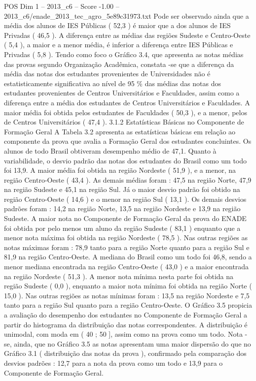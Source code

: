 \begin{textsample}{POS Dim 1 – 2013\_c6 – Score -1.00 – 2013\_c6/enade\_2013\_tec\_agro\_5e89c31973.txt}
Pode ser observado ainda que a média dos alunos de IES Públicas ( 52,3 ) é maior que a dos alunos de IES Privadas ( 46,5 ).
A diferença entre as médias das regiões Sudeste e Centro-Oeste ( 5,4 ), a maior e a menor média, é inferior a diferença entre IES Públicas e Privadas ( 5,8 ).
Tendo como foco o Gráfico 3.4, que apresenta as notas médias das provas segundo Organização Acadêmica, constata -se que a diferença da média das notas dos estudantes provenientes de Universidades não é estatisticamente significativa ao nível de 95 \% das médias das notas dos estudantes provenientes de Centros Universitários e Faculdades, assim como a diferença entre a média dos estudantes de Centros Universitários e Faculdades.
A maior média foi obtida pelos estudantes de Faculdades ( 50,3 ), e a menor, pelos de Centros Universitários ( 47,4 ). 3.1.2 Estatísticas Básicas no Componente de Formação Geral A Tabela 3.2 apresenta as estatísticas básicas em relação ao componente da prova que avalia a Formação Geral dos estudantes concluintes.
Os alunos de todo Brasil obtiveram desempenho médio de 47,1.
Quanto à variabilidade, o desvio padrão das notas dos estudantes do Brasil como um todo foi 13,9.
A maior média foi obtida na região Nordeste ( 51,9 ), e a menor, na região Centro-Oeste ( 43,4 ).
As demais médias foram : 47,5 na região Norte, 47,9 na região Sudeste e 45,1 na região Sul.
Já o maior desvio padrão foi obtido na região Centro-Oeste ( 14,6 ) e o menor na região Sul ( 13,1 ).
Os demais desvios padrões foram : 14,2 na região Norte, 13,5 na região Nordeste e 13,9 na região Sudeste.
A maior nota no Componente de Formação Geral da prova do ENADE foi obtida por pelo menos um aluno da região Sudeste ( 83,1 ) enquanto que a menor nota máxima foi obtida na região Nordeste ( 78,5 ).
Nas outras regiões as notas máximas foram : 78,9 tanto para a região Norte quanto para a região Sul e 81,9 na região Centro-Oeste.
A mediana do Brasil como um todo foi 46,8, sendo a menor mediana encontrada na região Centro-Oeste ( 43,0 ) e a maior encontrada na região Nordeste ( 51,3 ).
A menor nota mínima nesta parte foi obtida na região Sudeste ( 0,0 ), enquanto a maior nota mínima foi obtida na região Norte ( 15,0 ).
Nas outras regiões as notas mínimas foram : 13,5 na região Nordeste e 7,5 tanto para a região Sul quanto para a região Centro-Oeste.
O Gráfico 3.5 propicia a avaliação do desempenho dos estudantes no Componente de Formação Geral a partir do histograma da distribuição das notas correspondentes.
A distribuição é unimodal, com moda em ( 40 ; 50 ], assim como na prova como um todo.
Nota -se, ainda, que no Gráfico 3.5 as notas apresentam uma maior dispersão do que no Gráfico 3.1 ( distribuição das notas da prova ), confirmado pela comparação dos desvios padrões : 12,7 para a nota da prova como um todo e 13,9 para o Componente de Formação Geral.

\end{textsample}
